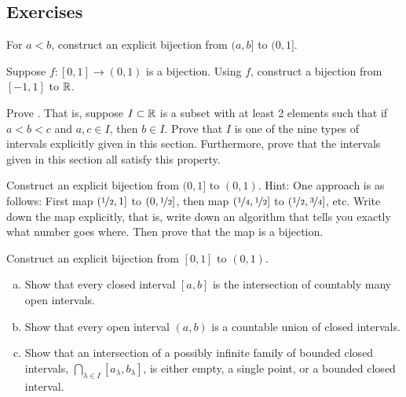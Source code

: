 \subsection{Exercises}

\begin{exercise}
For $a < b$, construct an explicit bijection from $(a,b]$ to $(0,1]$.
\end{exercise}

\begin{exercise}
Suppose $f \colon [0,1] \to (0,1)$ is a bijection.
Using $f$, construct a
bijection from $[-1,1]$ to ${\mathbb{R}}$.
\end{exercise}

\begin{exercise} \label{exercise:intervaldef}
Prove .
That is,
suppose $I \subset {\mathbb{R}}$ is a subset with at least 2 elements
such that if $a < b < c$ and $a, c \in I$, then $b \in I$.
Prove that $I$ is one of the nine types of intervals explicitly
given in this section.
Furthermore, prove that the intervals given in this section
all satisfy this property.
\end{exercise}

\begin{exercise}[Hard]
Construct an explicit bijection from $(0,1]$ to $(0,1)$.
Hint: One approach is as follows: First map $(\nicefrac{1}{2},1]$
to $(0,\nicefrac{1}{2}]$, then map
$(\nicefrac{1}{4},\nicefrac{1}{2}]$
to $(\nicefrac{1}{2},\nicefrac{3}{4}]$, etc.
Write down the map explicitly, that
is, write down an algorithm that tells you exactly what number goes where.
Then prove that the map is a bijection.
\end{exercise}

\begin{exercise}[Hard]
Construct an explicit bijection from $[0,1]$ to $(0,1)$.
\end{exercise}

\begin{exercise}
\leavevmode
\begin{enumerate}[a)]
\item
Show that every closed interval $[a,b]$ is the intersection
of countably many open intervals.
\item
Show that every open interval $(a,b)$
is a countable union of closed intervals.
\item
Show that an intersection
of a possibly infinite family of bounded closed intervals,
$\bigcap\limits_{\lambda \in I} [a_\lambda,b_\lambda]$,
is either empty, a single point,
or a bounded closed interval.
\end{enumerate}
\end{exercise}

